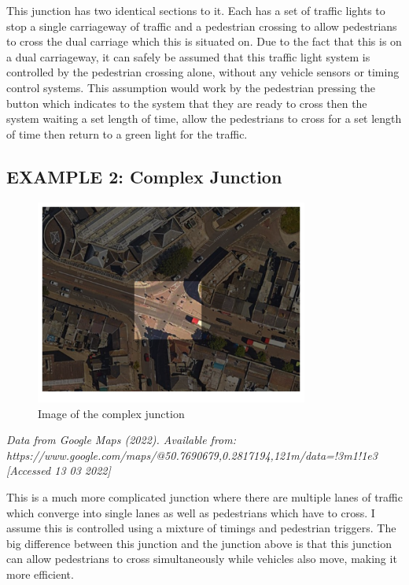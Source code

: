 \noindent This junction has two identical sections to it. Each has a set of traffic lights to stop a single carriageway of traffic and a pedestrian crossing to allow pedestrians to cross the dual carriage which this is situated on. Due to the fact that this is on a dual carriageway, it can safely be assumed that this traffic light system is controlled by the pedestrian crossing alone, without any vehicle sensors or timing control systems. This assumption would work by the pedestrian pressing the button which indicates to the system that they are ready to cross then the system waiting a set length of time, allow the pedestrians to cross for a set length of time then return to a green light for the traffic.

\subsection{EXAMPLE 2: Complex Junction}
\begin{figure}[H]
    \centering
    \includegraphics[width=0.8\textwidth]{images/Complex junction.png}
    \caption{Image of the complex junction}
    \label{fig:complexJunction}
\end{figure}
\noindent \textit{Data from Google Maps (2022). Available from:\\ https://www.google.com/maps/@50.7690679,0.2817194,121m/data=!3m1!1e3 [Accessed 13 03 2022]}\newline

\noindent This is a much more complicated junction where there are multiple lanes of traffic which converge into single lanes as well as pedestrians which have to cross. I assume this is controlled using a mixture of timings and pedestrian triggers. The big difference between this junction and the junction above is that this junction can allow pedestrians to cross simultaneously while vehicles also move, making it more efficient.